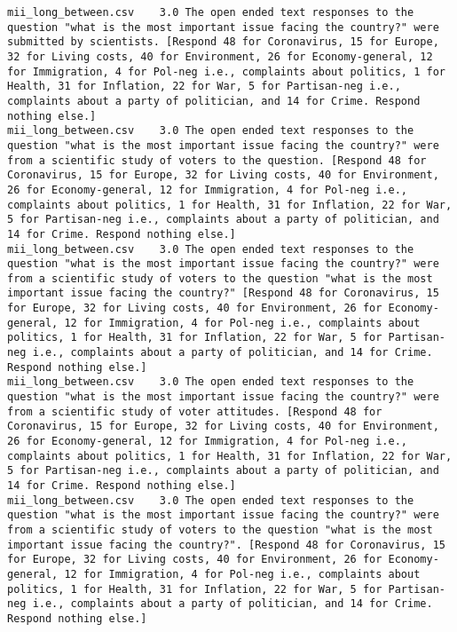 \begin{lstlisting}
mii_long_between.csv	3.0	The open ended text responses to the question "what is the most important issue facing the country?" were submitted by scientists. [Respond 48 for Coronavirus, 15 for Europe, 32 for Living costs, 40 for Environment, 26 for Economy-general, 12 for Immigration, 4 for Pol-neg i.e., complaints about politics, 1 for Health, 31 for Inflation, 22 for War, 5 for Partisan-neg i.e., complaints about a party of politician, and 14 for Crime. Respond nothing else.]
mii_long_between.csv	3.0	The open ended text responses to the question "what is the most important issue facing the country?" were from a scientific study of voters to the question. [Respond 48 for Coronavirus, 15 for Europe, 32 for Living costs, 40 for Environment, 26 for Economy-general, 12 for Immigration, 4 for Pol-neg i.e., complaints about politics, 1 for Health, 31 for Inflation, 22 for War, 5 for Partisan-neg i.e., complaints about a party of politician, and 14 for Crime. Respond nothing else.]
mii_long_between.csv	3.0	The open ended text responses to the question "what is the most important issue facing the country?" were from a scientific study of voters to the question "what is the most important issue facing the country?" [Respond 48 for Coronavirus, 15 for Europe, 32 for Living costs, 40 for Environment, 26 for Economy-general, 12 for Immigration, 4 for Pol-neg i.e., complaints about politics, 1 for Health, 31 for Inflation, 22 for War, 5 for Partisan-neg i.e., complaints about a party of politician, and 14 for Crime. Respond nothing else.]
mii_long_between.csv	3.0	The open ended text responses to the question "what is the most important issue facing the country?" were from a scientific study of voter attitudes. [Respond 48 for Coronavirus, 15 for Europe, 32 for Living costs, 40 for Environment, 26 for Economy-general, 12 for Immigration, 4 for Pol-neg i.e., complaints about politics, 1 for Health, 31 for Inflation, 22 for War, 5 for Partisan-neg i.e., complaints about a party of politician, and 14 for Crime. Respond nothing else.]
mii_long_between.csv	3.0	The open ended text responses to the question "what is the most important issue facing the country?" were from a scientific study of voters to the question "what is the most important issue facing the country?". [Respond 48 for Coronavirus, 15 for Europe, 32 for Living costs, 40 for Environment, 26 for Economy-general, 12 for Immigration, 4 for Pol-neg i.e., complaints about politics, 1 for Health, 31 for Inflation, 22 for War, 5 for Partisan-neg i.e., complaints about a party of politician, and 14 for Crime. Respond nothing else.]

\end{lstlisting}
